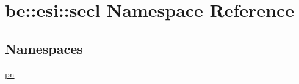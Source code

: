 \hypertarget{namespacebe_1_1esi_1_1secl}{}\section{be\+:\+:esi\+:\+:secl Namespace Reference}
\label{namespacebe_1_1esi_1_1secl}
\subsection*{Namespaces}
\begin{DoxyCompactItemize}
\item 
 \hyperlink{namespacebe_1_1esi_1_1secl_1_1pn}{pn}
\end{DoxyCompactItemize}
